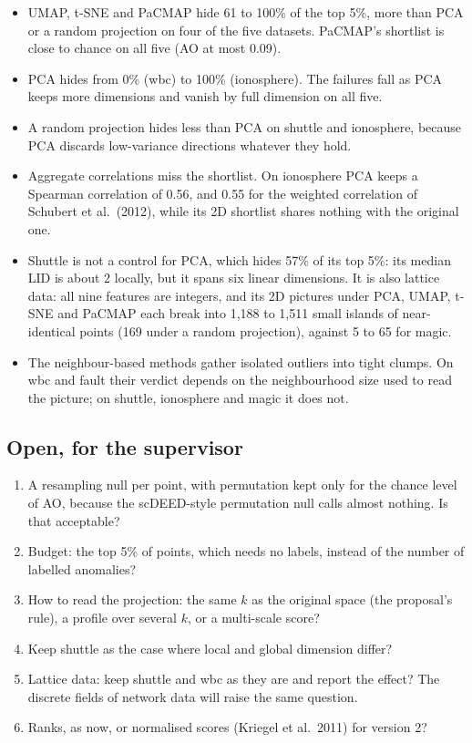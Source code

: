 \begin{itemize}
  \item UMAP, t-SNE and PaCMAP hide 61 to 100\% of the top 5\%, more than PCA
    or a random projection on four of the five datasets. PaCMAP's shortlist
    is close to chance on all five (AO at most 0.09).
  \item PCA hides from 0\% (wbc) to 100\% (ionosphere). The failures fall as
    PCA keeps more dimensions and vanish by full dimension on all five.
  \item A random projection hides less than PCA on shuttle and ionosphere,
    because PCA discards low-variance directions whatever they hold.
  \item Aggregate correlations miss the shortlist. On ionosphere PCA keeps a
    Spearman correlation of 0.56, and 0.55 for the weighted correlation of
    Schubert et al.\ (2012), while its 2D shortlist shares nothing with the
    original one.
  \item Shuttle is not a control for PCA, which hides 57\% of its top 5\%:
    its median LID is about 2 locally, but it spans six linear dimensions.
    It is also lattice data: all nine features are integers, and its 2D
    pictures under PCA, UMAP, t-SNE and PaCMAP each break into
    1,188 to 1,511 small islands of near-identical points
    (169 under a random projection), against 5 to 65 for magic.
  \item The neighbour-based methods gather isolated outliers into tight
    clumps. On wbc and fault their verdict depends on the neighbourhood size
    used to read the picture; on shuttle, ionosphere and magic it does not.
\end{itemize}

\subsection*{Open, for the supervisor}

\begin{enumerate}
  \item A resampling null per point, with permutation kept only for the
    chance level of AO, because the scDEED-style permutation null calls
    almost nothing. Is that acceptable?
  \item Budget: the top 5\% of points, which needs no labels, instead of the
    number of labelled anomalies?
  \item How to read the projection: the same $k$ as the original space (the
    proposal's rule), a profile over several $k$, or a multi-scale score?
  \item Keep shuttle as the case where local and global dimension differ?
  \item Lattice data: keep shuttle and wbc as they are and report the effect?
    The discrete fields of network data will raise the same question.
  \item Ranks, as now, or normalised scores (Kriegel et al.\ 2011) for
    version 2?
\end{enumerate}
